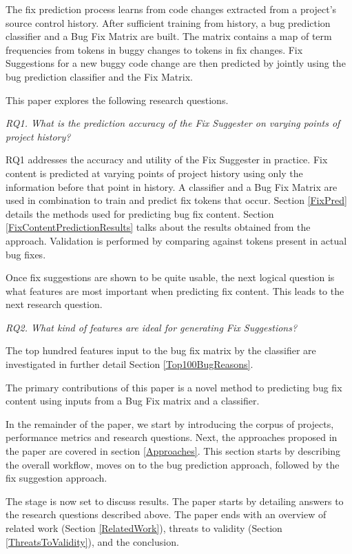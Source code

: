 \documentclass[preprint,10pt]{sigplanconf}
\begin{document}
The fix prediction process learns from code changes extracted from a project's source control history. After sufficient
training from history, a bug prediction classifier and a Bug Fix Matrix are built. The matrix contains a map of term frequencies from tokens in buggy changes to tokens in fix changes. Fix Suggestions for a new buggy code change are then predicted by jointly using the bug prediction classifier and the Fix Matrix.

This paper explores the following research questions.

\textit{RQ1. What is the prediction accuracy of the Fix Suggester on varying points of project history?}

RQ1 addresses the accuracy and utility of the Fix Suggester in practice. Fix content is predicted at varying points of project history using
only the information before that point in history. A classifier
and a Bug Fix Matrix are used in combination to train and predict fix tokens that occur. Section
\ref{FixPred} details the methods used for predicting
bug fix content. Section \ref{FixContentPredictionResults} talks
about the results obtained from the approach. Validation is performed by comparing against tokens present in actual bug fixes.

Once fix suggestions are shown to be quite usable, the next logical question is what features are most important when predicting fix content. This leads to the next research question. 

\textit{RQ2. What kind of features are ideal for generating Fix Suggestions?}

The top hundred features input to the bug fix matrix by the classifier are investigated in further detail Section \ref{Top100BugReasons}. 

The primary contributions of this paper is a novel method to predicting bug fix content using inputs from a Bug Fix matrix and a classifier. 

In the remainder of the paper, we start by introducing the corpus of projects, performance metrics and research questions. Next, the approaches proposed in the paper are covered in section \ref{Approaches}. This section starts by describing the overall workflow, moves
on to the bug prediction approach, followed by the fix suggestion approach.

The stage is now set to discuss results. The paper starts by detailing answers to the research questions
described above.
The paper ends with an overview of related work (Section \ref{RelatedWork}),
threats to validity (Section \ref{ThreatsToValidity}), and the conclusion.
\end{document}
